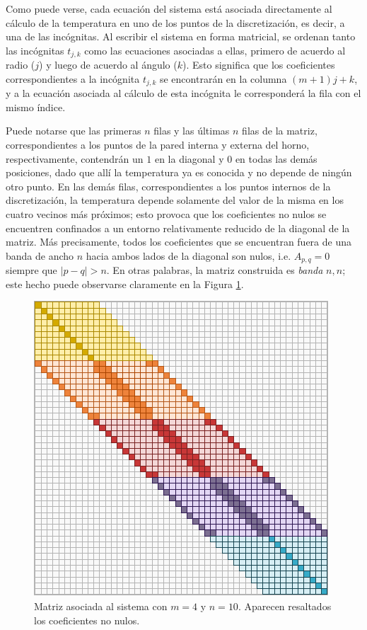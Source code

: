         Como puede verse, cada ecuación del sistema está asociada directamente al cálculo de la temperatura en uno de los puntos de la discretización, es decir, a una de las incógnitas. Al escribir el sistema en forma matricial, se ordenan tanto las incógnitas $t_{j,k}$ como las ecuaciones asociadas a ellas, primero de acuerdo al radio ($j$) y luego de acuerdo al ángulo ($k$). Esto significa que los coeficientes correspondientes a la incógnita $t_{j,k}$ se encontrarán en la columna $(m+1)j + k$, y a la ecuación asociada al cálculo de esta incógnita le corresponderá la fila con el mismo índice.

        Puede notarse que las primeras $n$ filas y las últimas $n$ filas de la matriz, correspondientes a los puntos de la pared interna y externa del horno, respectivamente, contendrán un $1$ en la diagonal y $0$ en todas las demás posiciones, dado que allí la temperatura ya es conocida y no depende de ningún otro punto. En las demás filas, correspondientes a los puntos internos de la discretización, la temperatura depende solamente del valor de la misma en los cuatro vecinos más próximos; esto provoca que los coeficientes no nulos se encuentren confinados a un entorno relativamente reducido de la diagonal de la matriz. Más precisamente, todos los coeficientes que se encuentran fuera de una banda de ancho $n$ hacia ambos lados de la diagonal son nulos, i.e. $A_{p,q} = 0$ siempre que $\vert p - q \vert > n$. En otras palabras, la matriz construida es \emph{banda} $n, n$; este hecho puede observarse claramente en la Figura \ref{fig:matriz-banda}.

        \begin{figure}[h]
          \centering

          \includegraphics{imagenes/matriz-banda.pdf}

          \caption{Matriz asociada al sistema con $m = 4$ y $n = 10$. Aparecen resaltados los coeficientes no nulos.}
          \label{fig:matriz-banda}
        \end{figure}

